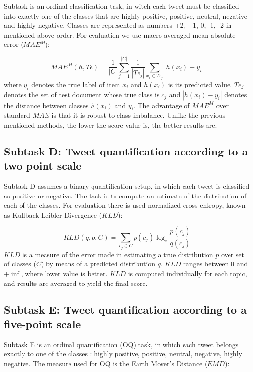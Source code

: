 \documentclass[runningheads,a4paper]{llncs}
\begin{document}
Subtask is an ordinal classification task, in witch each tweet must be classified into exactly one of the classes that are highly-positive, positive, neutral, negative and highly-negative. Classes are represented as numbers {+2, +1, 0, -1, -2} in mentioned above order. For evaluation we use macro-averaged mean absolute error ($MAE^M$):

\begin{equation}
MAE^M(h, Te) = \frac{1}{|C|}\sum_{j=1}^{|C|}\frac{1}{|Te_j|}\sum_{x_i\in Te_j}|h(x_i) - y_i|
\end{equation}
where $y_i$ denotes the true label of item $x_i$ and $h(x_i)$ is its predicted value. $Te_j$ denotes the set of test document whose true class is $c_j$ and $|h(x_i) - y_i|$ denotes the distance between classes $h(x_i)$ and $y_i$. The advantage of $MAE^M$ over standard $MAE$ is that it is robust to class imbalance. Unlike the previous mentioned methods, the lower the score value is, the better results are. 



\subsection{Subtask D: Tweet quantification according to a two point scale}

Subtask D assumes a binary quantification setup, in which each tweet is classified as positive or negative. The task is to compute an estimate of the distribution of each of the classes. For evaluation there is used normalized cross-entropy, known as Kullback-Leibler Divergence ($KLD$):

\begin{equation}
KLD(q, p, C) = \sum_{c_j \in C}p(c_j)\log_e\frac{p(c_j)}{q(c_j)}
\end{equation}
$KLD$ is a measure of the error made in estimating a true distribution $p$ over set of classes ($C$) by means of a predicted distribution $q$. $KLD$ ranges between 0 and $+\inf$, where lower value is better. $KLD$ is computed individually for each topic, and results are averaged to yield the final score.

\subsection{Subtask E: Tweet quantification according to a five-point scale}

Subtask E is an ordinal quantification (OQ) task, in which each tweet belongs exactly to one of the classes : highly positive, positive, neutral, negative, highly negative. The measure used for OQ is the Earth Mover's Distance ($EMD$):  
\end{document}
